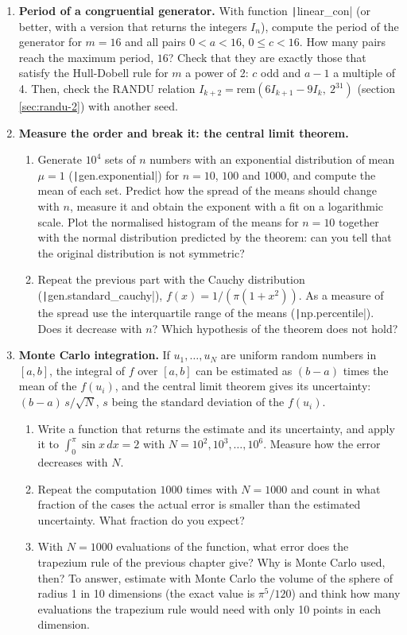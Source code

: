 \begin{enumerate}
\item \label{ej:lcg-en} \textbf{Period of a congruential generator.} With function \texttt|linear_con| (or better, with a version that returns the integers $I_n$), compute the period of the generator for $m=16$ and all pairs $0<a<16$, $0\leq c<16$. How many pairs reach the maximum period, $16$? Check that they are exactly those that satisfy the Hull-Dobell rule for $m$ a power of 2: $c$ odd and $a-1$ a multiple of 4. Then, check the RANDU relation $I_{k+2}=\text{rem}(6I_{k+1}-9I_k,\ 2^{31})$ (section \ref{sec:randu-2}) with another seed.

\item \label{ej:tlc_orden-en} \textbf{Measure the order and break it: the central limit theorem.}
\begin{enumerate}
\item Generate $10^4$ sets of $n$ numbers with an exponential distribution of mean $\mu=1$ (\texttt|gen.exponential|) for $n=10$, $100$ and $1000$, and compute the mean of each set. Predict how the spread of the means should change with $n$, measure it and obtain the exponent with a fit on a logarithmic scale. Plot the normalised histogram of the means for $n=10$ together with the normal distribution predicted by the theorem: can you tell that the original distribution is not symmetric?
\item Repeat the previous part with the Cauchy distribution (\texttt|gen.standard_cauchy|), $f(x)=1/\left(\pi(1+x^2)\right)$. As a measure of the spread use the interquartile range of the means (\texttt|np.percentile|). Does it decrease with $n$? Which hypothesis of the theorem does not hold?
\end{enumerate}

\item \label{ej:montecarlo-en} \textbf{Monte Carlo integration.} If $u_1,\dots,u_N$ are uniform random numbers in $[a,b]$, the integral of $f$ over $[a,b]$ can be estimated as $(b-a)$ times the mean of the $f(u_i)$, and the central limit theorem gives its uncertainty: $(b-a)\,s/\sqrt{N}$, $s$ being the standard deviation of the $f(u_i)$.
\begin{enumerate}
\item Write a function that returns the estimate and its uncertainty, and apply it to $\int_0^{\pi}\sin x\,dx=2$ with $N=10^2,10^3,\dots,10^6$. Measure how the error decreases with $N$.
\item Repeat the computation $1000$ times with $N=1000$ and count in what fraction of the cases the actual error is smaller than the estimated uncertainty. What fraction do you expect?
\item With $N=1000$ evaluations of the function, what error does the trapezium rule of the previous chapter give? Why is Monte Carlo used, then? To answer, estimate with Monte Carlo the volume of the sphere of radius 1 in 10 dimensions (the exact value is $\pi^5/120$) and think how many evaluations the trapezium rule would need with only 10 points in each dimension.
\end{enumerate}


\end{enumerate}
